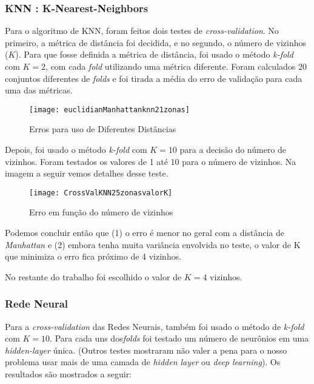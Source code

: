 \subsubsection{KNN : K-Nearest-Neighbors }


Para o algoritmo de KNN, foram feitos dois testes de \textit{cross-validation}. No primeiro, a métrica de distância foi decidida, e no segundo, o número de vizinhos ($K$).
Para que fosse definida a métrica de distância, foi usado o método  \textit{k-fold}  com $K=2$, com cada \textit{fold} utilizando uma métrica diferente. Foram calculados 20 conjuntos diferentes de \textit{folds} e foi tirada a média do erro de validação para cada uma das métricas.


\begin{figure}[H]
\centering
\caption{Erros para uso de Diferentes Distâncias}
 \texttt{[image: euclidianManhattanknn21zonas]}
\label{fig:euclidian}
\end{figure}


Depois, foi usado o método  \textit{k-fold} com $K=10$ para a decisão do número de vizinhos. Foram testados os valores de 1 até 10 para o número de vizinhos. Na imagem a seguir vemos detalhes desse teste.


\begin{figure}[H]
\centering
\caption{Erro em função do número de vizinhos}
 \texttt{[image: CrossValKNN25zonasvalorK]}
\label{fig:crossValKNN}
\end{figure}



Podemos concluir então que (1) o erro é menor no geral com a distância de \textit{Manhattan} e (2) embora tenha muita variância envolvida no teste, o valor de K que minimiza o erro fica próximo de 4 vizinhos.


No restante do trabalho foi escolhido o valor de $K=4$ vizinhos.



\subsubsection{Rede Neural}

Para a \textit{cross-validation} das Redes Neurais, também foi usado o método de  \textit{k-fold} com $K=10$. Para cada uns dos\textit{folds} foi testado um número de neurônios em uma  \textit{hidden-layer} única. (Outros testes mostraram não valer a pena para o nosso problema usar mais de uma camada de \textit{hidden layer} ou \textit{deep learning}). Os resultados são mostrados a seguir:



